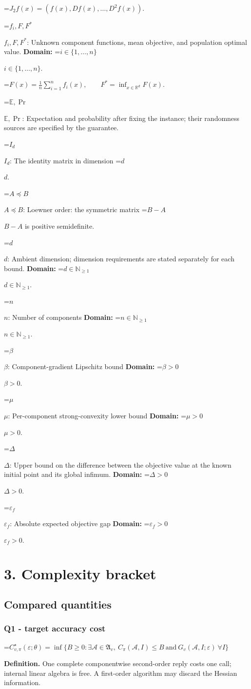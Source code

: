 \documentclass[10pt,a4paper]{article}
\newcommand{\AtlasMath}[1]{\par\begingroup\centering\setbox0=\hbox{$\displaystyle #1$}\ifdim\wd0>1.4\linewidth\typeout{ATLAS WIDE FORMULA: \the\wd0}\fi\ifdim\wd0>\linewidth\resizebox{\linewidth}{!}{\box0}\else\box0\fi\par\endgroup}
\newcommand{\AtlasInlineMath}[1]{\begingroup\setbox0=\hbox{$#1$}\ifdim\wd0>.4\linewidth\endgroup\AtlasMath{#1}\else\endgroup$#1$\fi}
\begin{document}
\AtlasMath{J_{2}f(x)=(f(x),Df(x),\ldots,D^{2}f(x)).}


\AtlasInlineMath{f_i,F,F^*}: Unknown component functions, mean objective, and population optimal value. \textbf{Domain:} \AtlasInlineMath{i\in\{1,\ldots,n\}}.


\AtlasMath{F(x)=\frac1n\sum_{i=1}^nf_i(x),\qquad F^*=\inf_{x\in\mathbb{R}^d}F(x).}


\AtlasInlineMath{\mathbb{E},\Pr}: Expectation and probability after fixing the instance; their randomness sources are specified by the guarantee.

\AtlasInlineMath{I_d}: The identity matrix in dimension \AtlasInlineMath{d}.

\AtlasInlineMath{A\preceq B}: Loewner order: the symmetric matrix \AtlasInlineMath{B-A} is positive semidefinite.

\AtlasInlineMath{d}: Ambient dimension; dimension requirements are stated separately for each bound. \textbf{Domain:} \AtlasInlineMath{d\in\mathbb{N}_{\ge 1}}.

\AtlasInlineMath{n}: Number of components \textbf{Domain:} \AtlasInlineMath{n\in\mathbb{N}_{\ge 1}}.

\AtlasInlineMath{\beta}: Component-gradient Lipschitz bound \textbf{Domain:} \AtlasInlineMath{\beta>0}.

\AtlasInlineMath{\mu}: Per-component strong-convexity lower bound \textbf{Domain:} \AtlasInlineMath{\mu>0}.

\AtlasInlineMath{\Delta}: Upper bound on the difference between the objective value at the known initial point and its global infimum. \textbf{Domain:} \AtlasInlineMath{\Delta>0}.

\AtlasInlineMath{\varepsilon_f}: Absolute expected objective gap \textbf{Domain:} \AtlasInlineMath{\varepsilon_f>0}.

\section{3. Complexity bracket}
\subsection{Compared quantities}
\subsubsection{Q1 - target accuracy cost}
\AtlasMath{C^\star_{v,\pi}(\varepsilon;\theta)=\inf\{B\ge0:\exists\mathcal A\in\mathfrak A_v,\ C_\pi(\mathcal A,I)\le B\ \text{and}\ G_v(\mathcal A,I;\varepsilon)\ \forall I\}}
\textbf{Definition.} One complete componentwise second-order reply costs one call; internal linear algebra is free. A first-order algorithm may discard the Hessian information.
\end{document}
